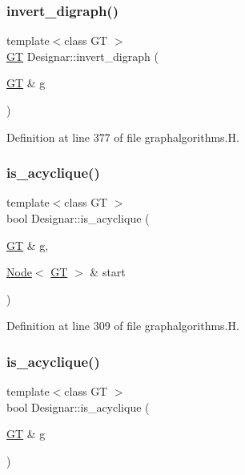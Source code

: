 \subsubsection{\texorpdfstring{invert\+\_\+digraph()}{invert\_digraph()}\hspace{0.1cm}{\footnotesize\ttfamily [2/2]}}
{\footnotesize\ttfamily template$<$class GT $>$ \\
\hyperlink{demo-buildgraph_8_c_a3001c40d2c31ca87ed96cd7d1334a55e}{GT} Designar\+::invert\+\_\+digraph (\begin{DoxyParamCaption}\item[{\hyperlink{demo-buildgraph_8_c_a3001c40d2c31ca87ed96cd7d1334a55e}{GT} \&}]{g }\end{DoxyParamCaption})}



Definition at line 377 of file graphalgorithms.\+H.

\mbox{\label{namespace_designar_a2312b1c69641afff1ae507474ddae644}} 
\subsubsection{\texorpdfstring{is\+\_\+acyclique()}{is\_acyclique()}\hspace{0.1cm}{\footnotesize\ttfamily [1/2]}}
{\footnotesize\ttfamily template$<$class GT $>$ \\
bool Designar\+::is\+\_\+acyclique (\begin{DoxyParamCaption}\item[{\hyperlink{demo-buildgraph_8_c_a3001c40d2c31ca87ed96cd7d1334a55e}{GT} \&}]{g,  }\item[{\hyperlink{namespace_designar_a5af326c65aa2bd26b26c410f2030d09e}{Node}$<$ \hyperlink{demo-buildgraph_8_c_a3001c40d2c31ca87ed96cd7d1334a55e}{GT} $>$ \&}]{start }\end{DoxyParamCaption})}



Definition at line 309 of file graphalgorithms.\+H.

\mbox{\label{namespace_designar_a961b99a3831c3c5d64c364f8cb2abc9f}} 
\subsubsection{\texorpdfstring{is\+\_\+acyclique()}{is\_acyclique()}\hspace{0.1cm}{\footnotesize\ttfamily [2/2]}}
{\footnotesize\ttfamily template$<$class GT $>$ \\
bool Designar\+::is\+\_\+acyclique (\begin{DoxyParamCaption}\item[{\hyperlink{demo-buildgraph_8_c_a3001c40d2c31ca87ed96cd7d1334a55e}{GT} \&}]{g }\end{DoxyParamCaption})}



